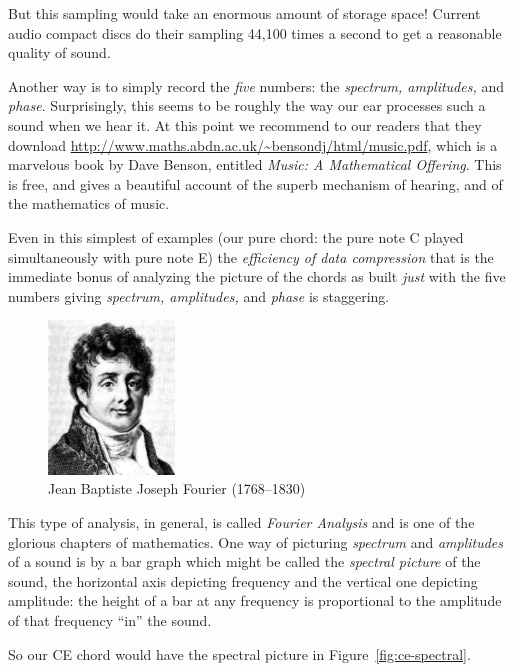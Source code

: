 \documentclass[11pt]{article}
\theoremstyle{plain}
\theoremstyle{definition}
\numberwithin{equation}{section}
\numberwithin{figure}{section}
\numberwithin{table}{section}
\begin{document}
But this sampling would take an enormous amount of storage space!
Current audio compact discs do their sampling 44,100 times a second to
get a reasonable quality of sound.

Another way is to simply record the {\em five} numbers: the {\em
  spectrum, amplitudes,} and {\em phase}.  Surprisingly, this seems to
be roughly the way our ear processes such a sound when we hear it.  At
this point we recommend to our readers that they download
\url{http://www.maths.abdn.ac.uk/~bensondj/html/music.pdf}, which is a
marvelous book by Dave Benson, entitled {\em Music: A Mathematical
  Offering}. This is free, and gives a beautiful account of the superb
mechanism of hearing, and of the mathematics of music.

  Even in this simplest of examples (our pure chord: the pure note C
  played simultaneously with pure note E) the {\em efficiency of data
    compression} that is the immediate bonus of analyzing the picture
  of the chords as built {\em just} with the five numbers giving {\em
    spectrum, amplitudes,} and {\em phase} is staggering.

\begin{figure}
\begin{center}
\includegraphics[width=0.3\textwidth]{illustrations/fourier}
\caption{Jean Baptiste Joseph Fourier (1768--1830)}
\end{center}
\end{figure}

This type of analysis, in general, is called {\em Fourier Analysis}
and is one of the glorious chapters of mathematics.  One way of
picturing {\em spectrum} and {\em amplitudes} of a sound is by a bar
graph which might be called the {\em spectral picture} of the sound,
the horizontal axis depicting frequency and the vertical one depicting
amplitude: the height of a bar at any frequency is proportional to the
amplitude of that frequency ``in'' the sound.
 
So our CE chord would have the spectral picture in
Figure~\ref{fig:ce-spectral}.
 
\end{document}
